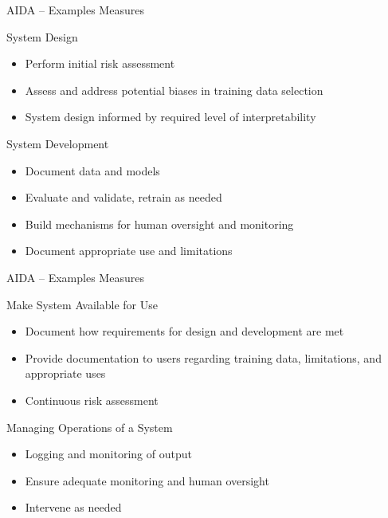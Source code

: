 \documentclass[ignorenonframetext,xcolor=x11names]{beamer}
\begin{document}
\begin{frame}{AIDA -- Examples Measures}
\begin{block}{System Design}
\begin{itemize}
   \item Perform initial risk assessment
   \item Assess and address potential biases in training data selection
   \item System design informed by required level of interpretability
\end{itemize}
\end{block}

\begin{block}{System Development}
\begin{itemize}
   \item Document data and models
   \item Evaluate and validate, retrain as needed
   \item Build mechanisms for human oversight and monitoring
   \item Document appropriate use and limitations
\end{itemize}
\end{block}
\end{frame}

\begin{frame}{AIDA -- Examples Measures}
\begin{block}{Make System Available for Use}
\begin{itemize}
   \item Document how requirements for design and development are met
   \item Provide documentation to users regarding training data, limitations, and appropriate uses
   \item Continuous risk assessment
\end{itemize}
\end{block}

\begin{block}{Managing Operations of a System}
\begin{itemize}
   \item Logging and monitoring of output
   \item Ensure adequate monitoring and human oversight
   \item Intervene as needed
\end{itemize}
\end{block}
\end{frame}
\end{document}

